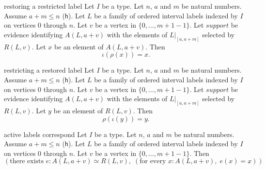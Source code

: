 \begin{cleanresult}{restoring a restricted label}
Let $I$ be a type.
Let $n$, $a$ and $m$ be natural numbers.
Assume $a+m\le n$ (\texttt{h}).
Let $L$ be a family of ordered interval labels indexed by $I$ on vertices $0$ through $n$.
Let $v$ be a vertex in $\{0,\ldots,m+1-1\}$.
Let $\mathit{support}$ be evidence identifying $A(L,a+v)$ with the elements of $L|_{[a,a+m]}$ selected by $R(L,v)$.
Let $x$ be an element of $A(L,a+v)$.
Then \[\iota(\rho(x))=x.\]
\end{cleanresult}

\begin{cleanresult}{restricting a restored label}
Let $I$ be a type.
Let $n$, $a$ and $m$ be natural numbers.
Assume $a+m\le n$ (\texttt{h}).
Let $L$ be a family of ordered interval labels indexed by $I$ on vertices $0$ through $n$.
Let $v$ be a vertex in $\{0,\ldots,m+1-1\}$.
Let $\mathit{support}$ be evidence identifying $A(L,a+v)$ with the elements of $L|_{[a,a+m]}$ selected by $R(L,v)$.
Let $y$ be an element of $R(L,v)$.
Then \[\rho(\iota(y))=y.\]
\end{cleanresult}

\begin{cleanresult}{active labels correspond}
Let $I$ be a type.
Let $n$, $a$ and $m$ be natural numbers.
Assume $a+m\le n$ (\texttt{h}).
Let $L$ be a family of ordered interval labels indexed by $I$ on vertices $0$ through $n$.
Let $v$ be a vertex in $\{0,\ldots,m+1-1\}$.
Then \[\left(\text{there exists }e : A(L,a+v)\simeq R(L,v),\; \left(\text{for every }x : A(L,a+v),\; e(x)=x\right)\right).\]
\end{cleanresult}

